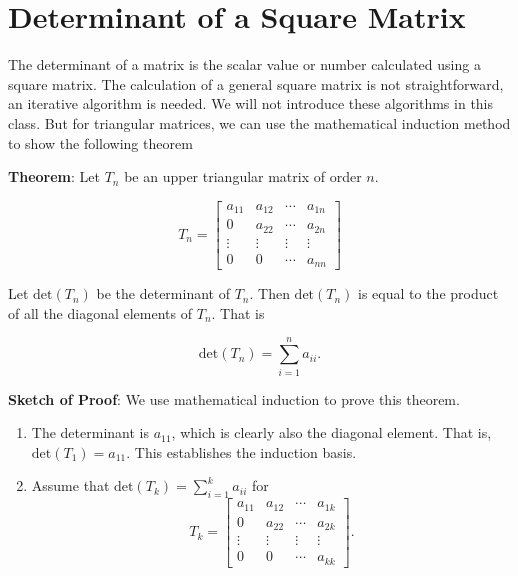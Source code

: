 \documentclass[
]{book}
\begin{document}
\hypertarget{determinant-of-a-square-matrix}{%
\section{Determinant of a Square Matrix}\label{determinant-of-a-square-matrix}}

The determinant of a matrix is the scalar value or number calculated using a square matrix. The calculation of a general square matrix is not straightforward, an iterative algorithm is needed. We will not introduce these algorithms in this class. But for triangular matrices, we can use the mathematical induction method to show the following theorem

\hfill\break

\textbf{Theorem}: Let \(T_n\) be an upper triangular matrix of order \(n\).

\[
T_{n} = \left[\begin{array}{ccccc} 
a_{11} & a_{12} & \cdots & a_{1n}  \\ 
0 & a_{22} & \cdots & a_{2n}  \\ 
\vdots & \vdots & \vdots & \vdots  \\
0 & 0 & \cdots & a_{nn}  
\end{array}
\right]
\]

Let \(\text{det}(T_n)\) be the determinant of \(T_n\). Then \(\text{det}(T_n)\) is equal to the product of all the diagonal elements of \(T_n\). That is

\[
\text{det}(T_n)=\sum_{i=1}^n a_{ii}.
\]

\textbf{Sketch of Proof}: We use mathematical induction to prove this theorem.

\begin{enumerate}
\def\labelenumi{\arabic{enumi}.}
\item
  The determinant is \(a_{11}\), which is clearly also the diagonal element. That is, \(\text{det}(T_1) = a_{11}\). This establishes the induction basis.
\item
  Assume that \(\text{det}(T_k) = \sum_{i=1}^k a_{ii}\) for
  \[
  T_{k} = \left[\begin{array}{ccccc} 
  a_{11} & a_{12} & \cdots & a_{1k}  \\ 
  0 & a_{22} & \cdots & a_{2k}  \\ 
  \vdots & \vdots & \vdots & \vdots  \\
  0 & 0 & \cdots & a_{kk}  
  \end{array}
  \right].
  \]
\end{enumerate}
\end{document}
